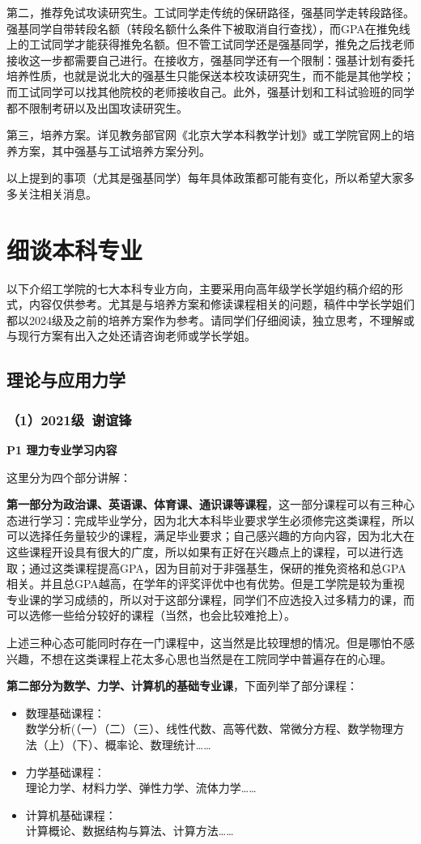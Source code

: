 \documentclass[11pt,oneside]{book}
\begin{document}
第二，推荐免试攻读研究生。工试同学走传统的保研路径，强基同学走转段路径。强基同学自带转段名额（转段名额什么条件下被取消自行查找），而GPA在推免线上的工试同学才能获得推免名额。但不管工试同学还是强基同学，推免之后找老师接收这一步都需要自己进行。在接收方，强基同学还有一个限制：强基计划有委托培养性质，也就是说北大的强基生只能保送本校攻读研究生，而不能是其他学校；而工试同学可以找其他院校的老师接收自己。此外，强基计划和工科试验班的同学都不限制考研以及出国攻读研究生。

第三，培养方案。详见教务部官网《北京大学本科教学计划》或工学院官网上的培养方案，其中强基与工试培养方案分列。

以上提到的事项（尤其是强基同学）每年具体政策都可能有变化，所以希望大家多多关注相关消息。

 
\section{细谈本科专业}
以下介绍工学院的七大本科专业方向，主要采用向高年级学长学姐约稿介绍的形式，内容仅供参考。尤其是与培养方案和修读课程相关的问题，稿件中学长学姐们都以2024级及之前的培养方案作为参考。请同学们仔细阅读，独立思考，不理解或与现行方案有出入之处还请咨询老师或学长学姐。
\subsection{理论与应用力学}
\subsubsection{（1）2021级\ 谢谊锋}
\textbf{P1 理力专业学习内容}

这里分为四个部分讲解：

\textbf{第一部分为政治课、英语课、体育课、通识课等课程}，这一部分课程可以有三种心态进行学习：完成毕业学分，因为北大本科毕业要求学生必须修完这类课程，所以可以选择任务量较少的课程，满足毕业要求；自己感兴趣的方向内容，因为北大在这些课程开设具有很大的广度，所以如果有正好在兴趣点上的课程，可以进行选取；通过这类课程提高GPA，因为目前对于非强基生，保研的推免资格和总GPA相关。并且总GPA越高，在学年的评奖评优中也有优势。但是工学院是较为重视专业课的学习成绩的，所以对于这部分课程，同学们不应选投入过多精力的课，而可以选修一些给分较好的课程（当然，也会比较难抢上）。

上述三种心态可能同时存在一门课程中，这当然是比较理想的情况。但是哪怕不感兴趣，不想在这类课程上花太多心思也当然是在工院同学中普遍存在的心理。
 
\textbf{第二部分为数学、力学、计算机的基础专业课}，下面列举了部分课程：
\begin{itemize}
    \item 数理基础课程：\\数学分析(（一）（二）（三）、线性代数、高等代数、常微分方程、数学物理方法（上）（下）、概率论、数理统计……
    \item 力学基础课程：\\理论力学、材料力学、弹性力学、流体力学……
    \item 计算机基础课程：\\计算概论、数据结构与算法、计算方法……
\end{itemize}
\end{document}
